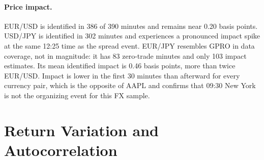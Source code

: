 \documentclass[11pt]{article}
\begin{document}
\paragraph{Price impact.}
EUR/USD is identified in 386 of 390 minutes and remains near 0.20 basis points. USD/JPY is identified in 302 minutes and experiences a pronounced impact spike at the same 12:25 time as the spread event. EUR/JPY resembles GPRO in data coverage, not in magnitude: it has 83 zero-trade minutes and only 103 impact estimates. Its mean identified impact is 0.46 basis points, more than twice EUR/USD. Impact is lower in the first 30 minutes than afterward for every currency pair, which is the opposite of AAPL and confirms that 09:30 New York is not the organizing event for this FX sample.

\section{Return Variation and Autocorrelation}
\end{document}
